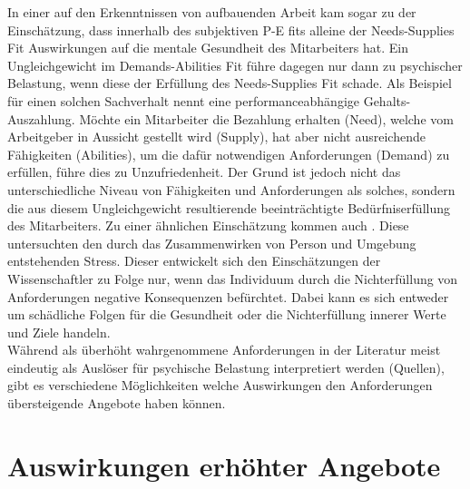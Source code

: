 In einer auf den Erkenntnissen von \textcite{copingAndAdaption:1974} aufbauenden Arbeit kam \textcite{harrison:1978} sogar zu der Einschätzung, dass innerhalb des subjektiven P-E fits alleine der Needs-Supplies Fit Auswirkungen auf die mentale Gesundheit des Mitarbeiters hat. Ein Ungleichgewicht im Demands-Abilities Fit führe dagegen nur dann zu psychischer Belastung, wenn diese der Erfüllung des Needs-Supplies Fit schade. Als Beispiel für einen solchen Sachverhalt nennt \textcite{harrison:1978} eine performanceabhängige Gehalts-Auszahlung. Möchte ein Mitarbeiter die Bezahlung erhalten (Need), welche vom Arbeitgeber in Aussicht gestellt wird (Supply), hat aber nicht ausreichende Fähigkeiten (Abilities), um die dafür notwendigen Anforderungen (Demand) zu erfüllen, führe dies zu Unzufriedenheit. Der Grund ist jedoch nicht das unterschiedliche Niveau von Fähigkeiten und Anforderungen als solches, sondern die aus diesem Ungleichgewicht resultierende beeinträchtigte Bedürfniserfüllung des Mitarbeiters. Zu einer ähnlichen Einschätzung kommen auch \textcite[S. 1ff.]{lazarus:1978}. Diese untersuchten den durch das Zusammenwirken von Person und Umgebung entstehenden Stress. Dieser entwickelt sich den Einschätzungen der Wissenschaftler zu Folge nur, wenn das Individuum durch die Nichterfüllung von Anforderungen negative Konsequenzen befürchtet. Dabei kann es sich entweder um schädliche Folgen für die Gesundheit oder die Nichterfüllung innerer Werte und Ziele handeln. \\
Während als überhöht wahrgenommene Anforderungen in der Literatur meist eindeutig als Auslöser für psychische Belastung interpretiert werden (Quellen), gibt es verschiedene Möglichkeiten welche Auswirkungen den Anforderungen übersteigende Angebote haben können.

\section{Auswirkungen erhöhter Angebote}
\label{ch:personEnvironmentFit:auswirkungenErhoehterAngebote}


